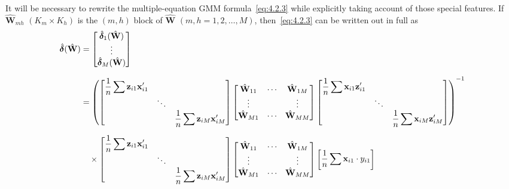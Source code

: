It will be necessary to rewrite the multiple-equation GMM formula~\eqref{eq:4.2.3}
while explicitly taking account of those special features. If
$\hat{\mathbf{W}}_{mh}$ $(K_m \times K_h)$ is the $(m, h)$ block of
$\hat{\mathbf{W}}$ $(m, h = 1, 2, \ldots, M)$, then~\eqref{eq:4.2.3} can be written
out in full as
\begin{align}
\hat{\boldsymbol{\delta}}(\hat{\mathbf{W}})
&= \begin{bmatrix}
\hat{\boldsymbol{\delta}}_1(\hat{\mathbf{W}}) \\ \vdots \\
\hat{\boldsymbol{\delta}}_M(\hat{\mathbf{W}})
\end{bmatrix} \notag \\[6pt]
&= \left(
\begin{bmatrix}
\dfrac{1}{n} \displaystyle\sum \mathbf{z}_{i1} \mathbf{x}_{i1}' & & \\
& \ddots & \\
& & \dfrac{1}{n} \displaystyle\sum \mathbf{z}_{iM} \mathbf{x}_{iM}'
\end{bmatrix}
\begin{bmatrix}
\hat{\mathbf{W}}_{11} & \cdots & \hat{\mathbf{W}}_{1M} \\
\vdots & & \vdots \\
\hat{\mathbf{W}}_{M1} & \cdots & \hat{\mathbf{W}}_{MM}
\end{bmatrix}
\begin{bmatrix}
\dfrac{1}{n} \displaystyle\sum \mathbf{x}_{i1} \mathbf{z}_{i1}' & & \\
& \ddots & \\
& & \dfrac{1}{n} \displaystyle\sum \mathbf{x}_{iM} \mathbf{z}_{iM}'
\end{bmatrix}
\right)^{-1} \notag \\[6pt]
&\quad \times
\begin{bmatrix}
\dfrac{1}{n} \displaystyle\sum \mathbf{z}_{i1} \mathbf{x}_{i1}' & & \\
& \ddots & \\
& & \dfrac{1}{n} \displaystyle\sum \mathbf{z}_{iM} \mathbf{x}_{iM}'
\end{bmatrix}
\begin{bmatrix}
\hat{\mathbf{W}}_{11} & \cdots & \hat{\mathbf{W}}_{1M} \\
\vdots & & \vdots \\
\hat{\mathbf{W}}_{M1} & \cdots & \hat{\mathbf{W}}_{MM}
\end{bmatrix}
\begin{bmatrix}
\dfrac{1}{n} \displaystyle\sum \mathbf{x}_{i1} \cdot y_{i1} \\[6pt]

\end{bmatrix}
\end{align}
